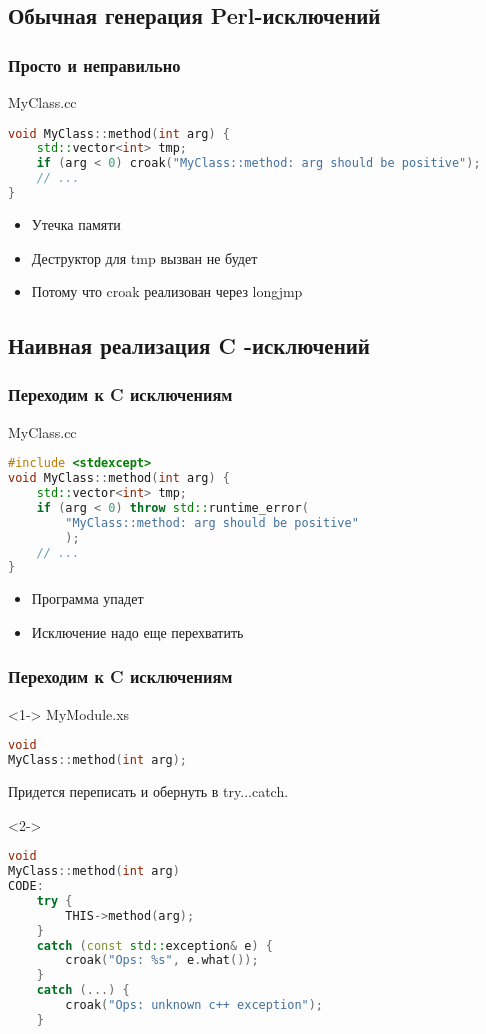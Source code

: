 \documentclass[pdflatex,hyperref={unicode=true}]{beamer}
\DeclareRobustCommand{\cpp}{
    \texorpdfstring{\hbox{C\hspace{-0.5ex}\protect\raisebox{0.5ex}{\protect\scalebox{0.67}{++}}}}{C++}
}
\begin{document}
\subsection{Обычная генерация Perl-исключений}
\begin{frame}[t,fragile]
    \frametitle{Просто и неправильно}
    MyClass.cc
    \begin{lstlisting}[language=C++,style=PerlXS]
void MyClass::method(int arg) {
    std::vector<int> tmp;
    if (arg < 0) croak("MyClass::method: arg should be positive");
    // ...
}
    \end{lstlisting}
    \begin{itemize}
        \item<2-| alert@2-> Утечка памяти
        \item<3-> Деструктор для tmp вызван не будет
        \item<4-> Потому что croak реализован через longjmp
    \end{itemize}
\end{frame}

\subsection{Наивная реализация \cpp-исключений}
\begin{frame}[t,fragile]
    \frametitle{Переходим к \cpp исключениям}
    MyClass.cc
    \begin{lstlisting}[language=C++,style=PerlXS]
#include <stdexcept>
void MyClass::method(int arg) {
    std::vector<int> tmp;
    if (arg < 0) throw std::runtime_error(
        "MyClass::method: arg should be positive"
        );
    // ...
}
    \end{lstlisting}
    \begin{itemize}
        \item Программа упадет
        \item Исключение надо еще перехватить
    \end{itemize}
\end{frame}

\begin{frame}[t,fragile]
    \frametitle{Переходим к \cpp исключениям}
    \begin{onlyenv}<1->
        MyModule.xs
        \begin{lstlisting}[language=C++,style=PerlXS]
void
MyClass::method(int arg);
        \end{lstlisting}
        Придется переписать и обернуть в try...catch.
    \end{onlyenv}
    \begin{onlyenv}<2->
        \begin{lstlisting}[language=C++,style=PerlXS]
void
MyClass::method(int arg)
CODE:
    try {
        THIS->method(arg);
    }
    catch (const std::exception& e) {
        croak("Ops: %s", e.what());
    }
    catch (...) {
        croak("Ops: unknown c++ exception");
    }
        \end{lstlisting}
    \end{onlyenv}
\end{frame}
\end{document}

